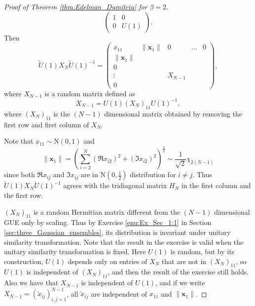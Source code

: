 \documentclass[11pt, a4paper]{article}
\numberwithin{equation}{section}
\newcommand{\Normal}{\mathrm{N}}
\renewcommand{\vec}[1]{\mathbf{#1}}
\theoremstyle{definition}
\theoremstyle{remark}
\begin{document}
\begin{proof}[Proof of Theorem \ref{thm:Edelman_Dumitriu} for $\beta = 2$]
\begin{equation}
    \begin{pmatrix}
      1 & 0 \\
      0 & U(1)
    \end{pmatrix}.
  \end{equation}
  Then
  \begin{equation}
    \tilde{U}(1) X_N \tilde{U}(1)^{-1} =
    \begin{pmatrix}
      x_{11} & \lVert \vec{x}_1 \rVert & 0 & \dots & 0 \\
      \lVert \vec{x}_1 \rVert & & & & \\
      0 & & & & \\
      \vdots & & X_{N - 1} & & \\
      0 & & & &
    \end{pmatrix},
  \end{equation}
  where $X_{N - 1}$ is a random matrix defined as
  \begin{equation}
    X_{N - 1} = U(1) (X_N)_{11} U(1)^{-1},
  \end{equation}
  where $(X_N)_{11}$ is the $(N - 1)$ dimensional matrix obtained by removing the first row and first column of $X_N$.

  Note that $x_{11} \sim \Normal(0, 1)$ and
  \begin{equation}
    \lVert \vec{x}_1 \rVert = \left( \sum^N_{i = 2} (\Re x_{i2})^2 + (\Im x_{i2})^2 \right)^{\frac{1}{2}} \sim \frac{1}{\sqrt{2}} \chi_{2(N - 1)}
  \end{equation}
  since both $\Re x_{ij}$ and $\Im x_{ij}$ are in $\Normal(0, \frac{1}{2})$ distribution for $i \neq j$. Thus $\tilde{U}(1) X_N \tilde{U}(1)^{-1}$ agrees with the tridiagonal matrix $H_N$ in the first column and the first row.

  $(X_N)_{11}$ is a random Hermitian matrix different from the $(N - 1)$ dimensional GUE only by scaling. Thus by Exercise \ref{enu:Ex_Sec_1:1} in Section \ref{sec:three_Gaussian_ensembles}, its distribution is invariant under unitary similarity transformation. Note that the result in the exercise is valid when the unitary similarity transformation is fixed. Here $U(1)$ is random, but by its construction, $U(1)$ depends only on entries of $X_N$ that are not in $(X_N)_{11}$, so $U(1)$ is independent of $(X_N)_{11}$, and then the result of the exercise still holds. Also we have that $X_{N - 1}$ is independent of $U(1)$, and if we write $X_{N - 1} = (\tilde{x}_{ij})^{N - 1}_{i, j = 1}$, all $\tilde{x}_{ij}$ are independent of $x_{11}$ and $\lVert \vec{x}_1 \rVert$.


\end{proof}
\end{document}
